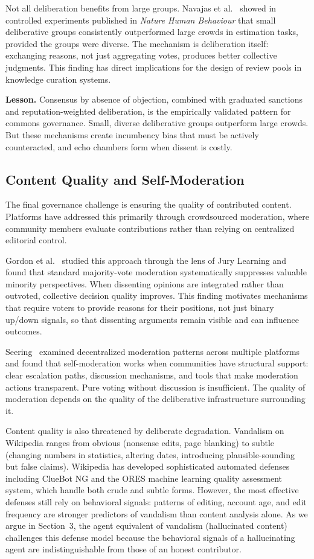 \documentclass[11pt]{article}
\begin{document}
Not all deliberation benefits from large groups. Navajas et al.~\cite{navajas2018} showed in controlled experiments published in \textit{Nature Human Behaviour} that small deliberative groups consistently outperformed large crowds in estimation tasks, provided the groups were diverse. The mechanism is deliberation itself: exchanging reasons, not just aggregating votes, produces better collective judgments. This finding has direct implications for the design of review pools in knowledge curation systems.

\textbf{Lesson.} Consensus by absence of objection, combined with graduated sanctions and reputation-weighted deliberation, is the empirically validated pattern for commons governance. Small, diverse deliberative groups outperform large crowds. But these mechanisms create incumbency bias that must be actively counteracted, and echo chambers form when dissent is costly.

\subsection{Content Quality and Self-Moderation}

The final governance challenge is ensuring the quality of contributed content. Platforms have addressed this primarily through crowdsourced moderation, where community members evaluate contributions rather than relying on centralized editorial control.

Gordon et al.~\cite{gordon2022} studied this approach through the lens of Jury Learning and found that standard majority-vote moderation systematically suppresses valuable minority perspectives. When dissenting opinions are integrated rather than outvoted, collective decision quality improves. This finding motivates mechanisms that require voters to provide reasons for their positions, not just binary up/down signals, so that dissenting arguments remain visible and can influence outcomes.

Seering~\cite{seering2020} examined decentralized moderation patterns across multiple platforms and found that self-moderation works when communities have structural support: clear escalation paths, discussion mechanisms, and tools that make moderation actions transparent. Pure voting without discussion is insufficient. The quality of moderation depends on the quality of the deliberative infrastructure surrounding it.

Content quality is also threatened by deliberate degradation. Vandalism on Wikipedia ranges from obvious (nonsense edits, page blanking) to subtle (changing numbers in statistics, altering dates, introducing plausible-sounding but false claims). Wikipedia has developed sophisticated automated defenses including ClueBot NG and the ORES machine learning quality assessment system, which handle both crude and subtle forms. However, the most effective defenses still rely on behavioral signals: patterns of editing, account age, and edit frequency are stronger predictors of vandalism than content analysis alone. As we argue in Section~3, the agent equivalent of vandalism (hallucinated content) challenges this defense model because the behavioral signals of a hallucinating agent are indistinguishable from those of an honest contributor.
\end{document}
